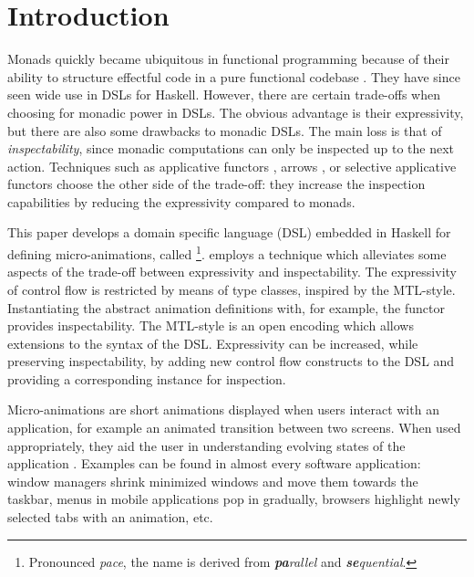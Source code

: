 \section{Introduction}
\label{sec:intro}

Monads quickly became ubiquitous in functional programming because of their ability to structure effectful code in a pure functional codebase \cite{DBLP:conf/lfp/Wadler90}. They have since seen wide use in DSLs for Haskell. However, there are certain trade-offs when choosing for monadic power in DSLs. The obvious advantage is their expressivity, but there are also some drawbacks to monadic DSLs. The main loss is that of \emph{inspectability}, since monadic computations can only be inspected up to the next action. Techniques such as applicative functors \cite{DBLP:journals/jfp/McbrideP08}, arrows \cite{DBLP:journals/scp/Hughes00}, or selective applicative functors \cite{Mokhov:2019:SAF:3352468.3341694} choose the other side of the trade-off: they increase the inspection capabilities by reducing the expressivity compared to monads.

This paper develops a domain specific language (DSL) embedded in Haskell for defining micro-animations, called \dsl{}\footnote{Pronounced \textit{pace}, the name is derived from \textit{\textbf{pa}rallel} and \textit{\textbf{se}quential}.}. \dsl{} employs a technique which alleviates some aspects of the trade-off between expressivity and inspectability. The expressivity of control flow is restricted by means of type classes, inspired by the MTL-style. Instantiating the abstract animation definitions with, for example, the  functor provides inspectability. The MTL-style is an open encoding which allows extensions to the syntax of the DSL. Expressivity can be increased, while preserving inspectability, by adding new control flow constructs to the DSL and providing a corresponding instance for inspection.

Micro-animations are short animations displayed when users interact with an application, for example an animated transition between two screens. When used appropriately, they aid the user in understanding evolving states of the application \cite{DBLP:conf/infovis/BedersonB99,DBLP:conf/chi/Gonzalez96,DBLP:journals/tvcg/HeerR07}. Examples can be found in almost every software application: window managers shrink minimized windows and move them towards the taskbar, menus in mobile applications pop in gradually, browsers highlight newly selected tabs with an animation, etc.

